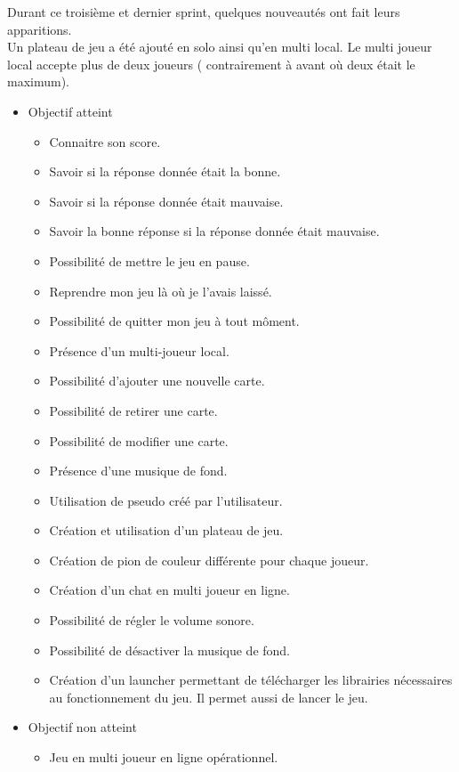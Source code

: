 Durant ce troisième et dernier sprint, quelques nouveautés ont fait leurs apparitions.\\
Un plateau de jeu a été ajouté en solo ainsi qu'en multi local.
Le multi joueur local accepte plus de deux joueurs ( contrairement à avant où deux était le maximum).

\begin{itemize}
	\item Objectif atteint
	\begin{itemize}
		\item Connaitre son score.
		\item Savoir si la réponse donnée était la bonne.
		\item Savoir si la réponse donnée était mauvaise.
		\item Savoir la bonne réponse si la réponse donnée était mauvaise.
		\item Possibilité de mettre le jeu en pause.
		\item Reprendre mon jeu là où je l'avais laissé.
		\item Possibilité de quitter mon jeu à tout môment.
		\item Présence d'un multi-joueur local.
		\item Possibilité d'ajouter une nouvelle carte.
		\item Possibilité de retirer une carte.
		\item Possibilité de modifier une carte.
		\item Présence d'une musique de fond.
		\item Utilisation de pseudo créé par l'utilisateur.
		\item Création et utilisation d'un plateau de jeu.
		\item Création de pion de couleur différente pour chaque joueur.
		\item Création d'un chat en multi joueur en ligne.
		\item Possibilité de régler le volume sonore.
		\item Possibilité de désactiver la musique de fond.
		\item Création d'un launcher permettant de télécharger les librairies nécessaires au fonctionnement du jeu. Il permet aussi de lancer le jeu.
	\end{itemize}
	\item Objectif non atteint
	\begin{itemize}
		\item Jeu en multi joueur en ligne opérationnel.
	\end{itemize}
\end{itemize}